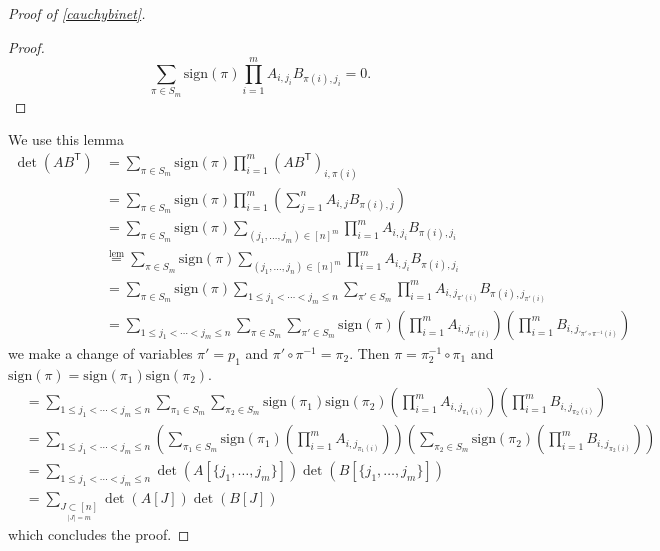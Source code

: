 \begin{proof}[Proof of \ref{cauchybinet}]
\begin{proof}
$$
\sum _{\pi \in S_{m}}\mathrm{sign}(\pi)\prod_{i=1}^{m} A_{i,j_{i}}B_{\pi(i),j_{i}}=0.
$$
\end{proof}
We use this lemma 
\begin{align*}
\det(AB^{\mathsf{T}}) & =\sum _{\pi \in S_{m}}\mathrm{sign}(\pi)\prod_{i=1}^{m} (AB^{\mathsf{T}})_{i,\pi(i)} \\
 & =\sum _{\pi \in S_{m}}\mathrm{sign}(\pi)\prod_{i=1}^{m} \left( \sum_{j=1}^{n} A_{i,j}B_{\pi(i),j} \right) \\
 & =\sum _{\pi \in S_{m}}\mathrm{sign}(\pi)\sum _{(j_{1},\dots,j_{m})\in[n]^{m}}\prod_{i=1}^{m} A_{i,j_{i}}B_{\pi(i),j_{i}} \\
 & \overset{\mathrm{lem}}=\sum _{\pi \in S_{m}}\mathrm{sign}(\pi)\sum _{(j_{1},\dots,j_{n})\in[n]^{m}}\prod_{i=1}^{m} A_{i,j_{i}}B_{\pi(i),j_{i}} \\
 & =\sum _{\pi \in S_{m}}\mathrm{sign}(\pi)\sum _{1\le j_{1}<\cdots<j_{m}\le n }\sum _{\pi'\in S_{m}}\prod_{i=1}^{m} A_{i,j_{\pi'(i)} }B_{\pi(i),j_{\pi'(i)}} \\
 & = \sum _{1 \le j_{1}< \cdots < j_{m}\le n}\sum _{\pi \in S_{m}}\sum _{\pi'\in S_{m}}\mathrm{sign}(\pi)\left( \prod_{i=1}^{m} A_{i,j_{\pi'(i)}} \right)\left( \prod_{i=1}^{m} B_{i,j_{'\pi'\circ\pi ^{-1}(i)}} \right)
\end{align*}
we make a change of variables $\pi'=p_{1}$ and $\pi'\circ\pi ^{-1}=\pi_{2}$. Then $\pi=\pi_{2}^{-1}\circ\pi_{1}$ and $\mathrm{sign}(\pi)=\mathrm{sign}(\pi_{1})\mathrm{sign}(\pi_{2})$.
\begin{align*}
 & =\sum _{1\le j_{1}<\cdots<j_{m}\le n}\sum _{\pi_{1}\in S_{m}}\sum _{\pi_{2}\in S_{m}}\mathrm{sign}(\pi_{1})\mathrm{sign}(\pi_{2})\left( \prod_{i=1}^{m} A_{i,j_{\pi_{1}(i)}} \right)\left( \prod_{i=1}^{m}B_{i,j_{\pi_{2}(i)}}  \right) \\
 & =\sum _{1\le j_{1}<\cdots<j_{m}\le n}\left( \sum _{\pi_{1}\in S_{m}}\mathrm{sign}(\pi_{1})\left( \prod_{i=1}^{m} A_{i,j_{\pi_{1}(i)}} \right) \right)\left( \sum _{\pi_{2}\in S_{m}}\mathrm{sign}(\pi_{2})\left( \prod_{i=1}^{m} B_{i,j_{\pi_{2}(i)}} \right) \right) \\
 & =\sum _{1\le j_{1}<\cdots<j_{m}\le n}\det(A[\{ j_{1},\dots,j_{m} \}])\det(B[\{ j_{1},\dots,j_{m} \}]) \\
 & =\sum _{\underset{|J|=m}{J\subset[n]}}\det(A[J])\det(B[J]) 
\end{align*}
which concludes the proof.
\end{proof}